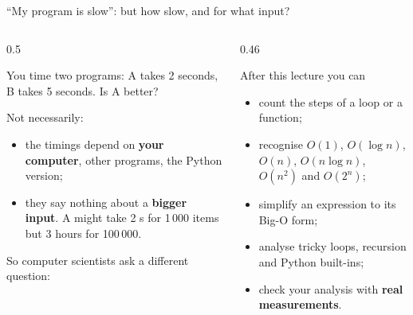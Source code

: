 \documentclass[aspectratio=169,10pt]{beamer}
\begin{document}
\begin{frame}[plain]\titlepage\end{frame}

\begin{frame}{``My program is slow'': but how slow, and for what input?}
\begin{columns}[T]
\begin{column}{0.5\textwidth}
{\small
You time two programs: A takes 2 seconds, B takes 5 seconds. Is A better?

\vspace{2mm}
Not necessarily:
\begin{itemize}\setlength\itemsep{2pt}
\item the timings depend on \textbf{your computer}, other programs, the Python version;
\item they say nothing about a \textbf{bigger input}. A might take 2 s for 1\,000 items but 3 hours for 100\,000.
\end{itemize}
\vspace{1mm}
So computer scientists ask a different question: }
\end{column}
\begin{column}{0.46\textwidth}
\begin{block}{After this lecture you can}
{\small
\begin{itemize}\setlength\itemsep{2pt}
\item count the steps of a loop or a function;
\item recognise $O(1)$, $O(\log n)$, $O(n)$, $O(n\log n)$, $O(n^2)$ and $O(2^n)$;
\item simplify an expression to its Big-O form;
\item analyse tricky loops, recursion and Python built-ins;
\item check your analysis with \textbf{real measurements}.
\end{itemize}}
\end{block}
\end{column}
\end{columns}
\end{frame}
\end{document}
